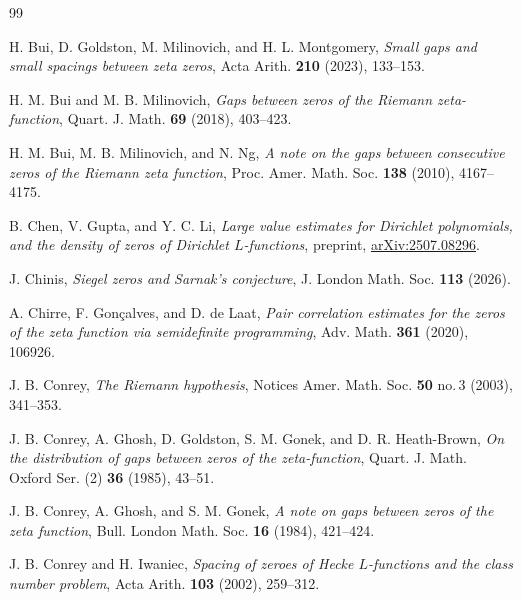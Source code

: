 \documentclass[12pt, oneside]{amsart}
\theoremstyle{definition}
\newcommand{\1}{\mathds{1}}
\begin{document}
\begin{thebibliography}{99}

 H. Bui, D. Goldston, M. Milinovich, and H. L. Montgomery, \emph{Small gaps and small spacings between zeta zeros}, Acta Arith. {\bf 210} (2023), 133--153.

 H. M. Bui and M. B. Milinovich, \emph{Gaps between zeros of the Riemann zeta-function}, Quart. J. Math. {\bf 69} (2018), 403--423.

 H. M. Bui, M. B. Milinovich, and N. Ng, \emph{A note on the gaps between consecutive zeros of the Riemann zeta function}, Proc. Amer. Math. Soc. {\bf 138} (2010), 4167--4175.

 B. Chen, V. Gupta, and Y. C. Li, \emph{Large value estimates for Dirichlet polynomials, and the density of zeros of Dirichlet $L$-functions}, preprint, \href{https://arxiv.org/abs/2507.08296}{arXiv:2507.08296}.

 J. Chinis, \emph{Siegel zeros and Sarnak's conjecture}, J. London Math. Soc. {\bf 113} (2026).

 A. Chirre, F. Gon\c{c}alves, and D. de Laat, \emph{Pair correlation estimates for the zeros of the zeta function via semidefinite programming}, Adv. Math. {\bf 361} (2020), 106926.


 J. B. Conrey, \emph{The Riemann hypothesis}, Notices Amer. Math. Soc. {\bf 50} no.\,3 (2003), 341--353.

 J. B. Conrey, A. Ghosh, D. Goldston, S. M. Gonek, and D. R. Heath-Brown, \emph{On the distribution of gaps between zeros of the zeta-function}, Quart. J. Math. Oxford Ser. (2) {\bf 36} (1985), 43--51.

 J. B. Conrey, A. Ghosh, and S. M. Gonek, \emph{A note on gaps between zeros of the zeta function}, Bull. London Math. Soc. {\bf 16} (1984), 421--424.

 J. B. Conrey and H. Iwaniec, \emph{Spacing of zeroes of Hecke $L$-functions and the class number problem}, Acta Arith. {\bf 103} (2002), 259--312.



\end{thebibliography}
\end{document}
